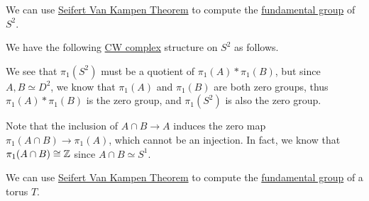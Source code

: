 \begin{eg}
	We can use \hyperref[thm:Seifert-Van-Kampen-Theorem]{Seifert Van Kampen Theorem} to compute the \hyperref[def:fundamental-group]{fundamental group}
	of \(S^{2}\).
\end{eg}
\begin{explanation}
	We have the following \hyperref[def:CW-Complex]{CW complex} structure on \(S^2\) as follows.
	\begin{figure}[H]
		\centering
		\label{fig:lec11-eg:2-sphere}
	\end{figure}
	We see that \(\pi _1(S^{2} )\) must be a quotient of \(\pi _1(A)\ast \pi _1(B)\), but since \(A, B\simeq D^{2} \), we know that
	\(\pi _1(A)\) and \(\pi _1(B)\) are both zero groups, thus \(\pi _1(A)\ast \pi _1(B)\) is the zero group, and \(\pi _1(S^{2} )\) is
	also the zero group.
	\begin{remark}
		Note that the inclusion of \(A\cap B\to A\) induces the zero map \(\pi _1(A\cap B)\to \pi _1(A)\), which cannot be an injection.
		In fact, we know that \(\pi _1(A\cap B)\cong \mathbb{\MakeUppercase{z}} \) since \(A\cap B\simeq S^1\).
	\end{remark}
\end{explanation}
\begin{eg}\label{lec11:eg:torus}
	We can use \hyperref[thm:Seifert-Van-Kampen-Theorem]{Seifert Van Kampen Theorem} to compute the \hyperref[def:fundamental-group]{fundamental group}
	of a torus \(T\).
\end{eg}
